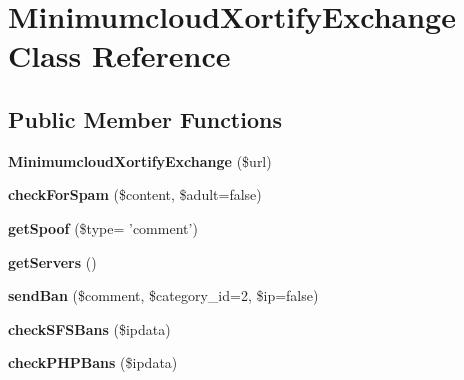 \hypertarget{class_minimumcloud_xortify_exchange}{\section{Minimumcloud\-Xortify\-Exchange Class Reference}
\label{class_minimumcloud_xortify_exchange}
}
\subsection*{Public Member Functions}
\begin{DoxyCompactItemize}
\item 
\hypertarget{class_minimumcloud_xortify_exchange_a8dff748c306a7e99366036717f04b6f9}{{\bfseries Minimumcloud\-Xortify\-Exchange} (\$url)}\label{class_minimumcloud_xortify_exchange_a8dff748c306a7e99366036717f04b6f9}

\item 
\hypertarget{class_minimumcloud_xortify_exchange_a3feb4bc858f8b48ef53c1d19aba55809}{{\bfseries check\-For\-Spam} (\$content, \$adult=false)}\label{class_minimumcloud_xortify_exchange_a3feb4bc858f8b48ef53c1d19aba55809}

\item 
\hypertarget{class_minimumcloud_xortify_exchange_a8cda91910a94f1fb328c020fa79d64bd}{{\bfseries get\-Spoof} (\$type= 'comment')}\label{class_minimumcloud_xortify_exchange_a8cda91910a94f1fb328c020fa79d64bd}

\item 
\hypertarget{class_minimumcloud_xortify_exchange_a9fd75ffb7df1908d667ff2cf98e201e0}{{\bfseries get\-Servers} ()}\label{class_minimumcloud_xortify_exchange_a9fd75ffb7df1908d667ff2cf98e201e0}

\item 
\hypertarget{class_minimumcloud_xortify_exchange_a01d8b70ec372cd43823120888edd8d65}{{\bfseries send\-Ban} (\$comment, \$category\-\_\-id=2, \$ip=false)}\label{class_minimumcloud_xortify_exchange_a01d8b70ec372cd43823120888edd8d65}

\item 
\hypertarget{class_minimumcloud_xortify_exchange_aa4657ff1aa9f0851a601523573c3fac2}{{\bfseries check\-S\-F\-S\-Bans} (\$ipdata)}\label{class_minimumcloud_xortify_exchange_aa4657ff1aa9f0851a601523573c3fac2}

\item 
\hypertarget{class_minimumcloud_xortify_exchange_a8366484818135234d3f2e4c9176b52f0}{{\bfseries check\-P\-H\-P\-Bans} (\$ipdata)}\label{class_minimumcloud_xortify_exchange_a8366484818135234d3f2e4c9176b52f0}


\end{DoxyCompactItemize}

